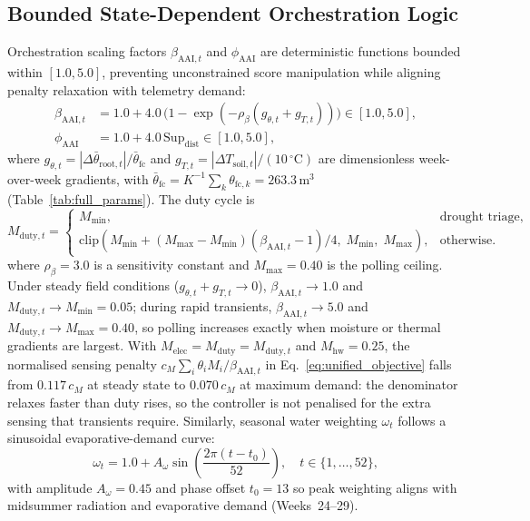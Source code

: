 \documentclass[11pt,a4paper]{article}
\newcommand{\clip}[1]{\mathrm{clip}\!\left(#1\right)}
\newcommand{\AAI}{\mathrm{AAI}}
\begin{document}
\subsection{Bounded State-Dependent Orchestration Logic}
Orchestration scaling factors $\beta_{\AAI,t}$ and $\phi_{\AAI}$ are deterministic functions bounded within $[1.0, 5.0]$, preventing unconstrained score manipulation while aligning penalty relaxation with telemetry demand:
\begin{align}
  \beta_{\AAI,t} &= 1.0 + 4.0\,\Big(1 - \exp\!\left(-\rho_\beta \left(g_{\theta,t} + g_{T,t}\right)\right)\Big) \in [1.0, 5.0], \label{eq:beta_rule} \\
  \phi_{\AAI} &= 1.0 + 4.0\,\mathrm{Sup}_{\mathrm{dist}} \in [1.0, 5.0], \label{eq:phi_rule}
\end{align}
where $g_{\theta,t} = |\Delta\bar\theta_{\mathrm{root},t}|/\bar\theta_{\mathrm{fc}}$ and $g_{T,t} = |\Delta T_{\mathrm{soil},t}|/(10\,^{\circ}\mathrm{C})$ are dimensionless week-over-week gradients, with $\bar\theta_{\mathrm{fc}}=K^{-1}\sum_k\theta_{\mathrm{fc},k}=263.3\,\mathrm{m}^3$ (Table~\ref{tab:full_params}). The duty cycle is
\begin{equation}
  M_{\mathrm{duty},t} = \begin{cases}
    M_{\min}, & \text{drought triage},\\
    \clip{M_{\min}+(M_{\max}-M_{\min})(\beta_{\AAI,t}-1)/4,\;M_{\min},\;M_{\max}}, & \text{otherwise}.
  \end{cases}
  \label{eq:duty_rule}
\end{equation}
 where $\rho_\beta = 3.0$ is a sensitivity constant and $M_{\max}=0.40$ is the polling ceiling. Under steady field conditions ($g_{\theta,t}+g_{T,t}\to0$), $\beta_{\AAI,t}\to1.0$ and $M_{\mathrm{duty},t}\to M_{\min}=0.05$; during rapid transients, $\beta_{\AAI,t}\to5.0$ and $M_{\mathrm{duty},t}\to M_{\max}=0.40$, so polling increases exactly when moisture or thermal gradients are largest. With $M_{\mathrm{elec}}=M_{\mathrm{duty}}=M_{\mathrm{duty},t}$ and $M_{\mathrm{hw}}=0.25$, the normalised sensing penalty $c_M\sum_i\theta_i M_i/\beta_{\AAI,t}$ in Eq.~\eqref{eq:unified_objective} falls from $0.117\,c_M$ at steady state to $0.070\,c_M$ at maximum demand: the denominator relaxes faster than duty rises, so the controller is not penalised for the extra sensing that transients require. Similarly, seasonal water weighting $\omega_t$ follows a sinusoidal evaporative-demand curve:
\begin{equation}
  \omega_t = 1.0 + A_\omega \sin\!\left(\frac{2\pi (t - t_0)}{52}\right), \quad t \in \{1,\dots,52\},
  \label{eq:omega_fao}
\end{equation}
with amplitude $A_\omega = 0.45$ and phase offset $t_0 = 13$ so peak weighting aligns with midsummer radiation and evaporative demand (Weeks~24--29).
\end{document}
